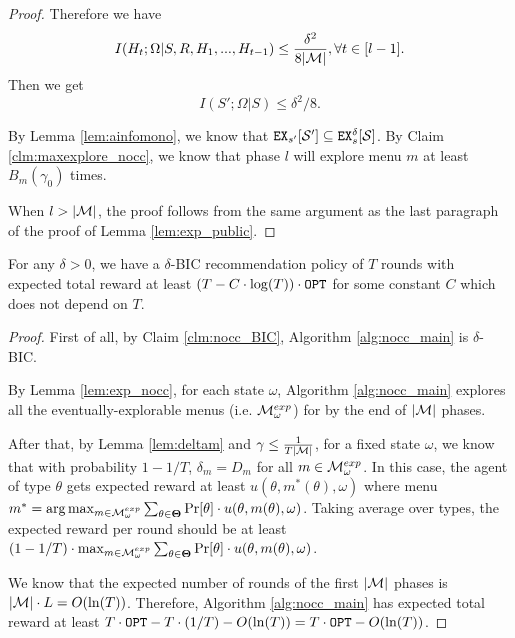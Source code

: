 \begin{proof}
Therefore we have
\[
I(H_t; \Omega|S,R,H_1,...,H_{t-1}) \leq \frac{\delta^2}{8|\mathcal{M}|}, \forall t \in [l-1].
\]
Then we get 
\[
I(S'; \Omega | S) \leq \delta^2/8.
\]

By Lemma \ref{lem:ainfomono}, we know that $\mathtt{EX}_{s'}[\mathcal{S}'] \subseteq \mathtt{EX}^{\delta}_s[\mathcal{S}]$. By Claim \ref{clm:maxexplore_nocc}, we know that phase $l$ will explore menu $m$ at least $B_m(\gamma_0)$ times.

When $l > |\mathcal{M}|$, the proof follows from the same argument as the last paragraph of the proof of Lemma \ref{lem:exp_public}.
\end{proof}

\begin{corollary}
\label{cor:private_nocc}
For any $\delta > 0$, we have a $\delta$-BIC recommendation policy of $T$ rounds with expected total reward at least $\left(T - C\cdot \log(T) \right) \cdot \mathtt{OPT}$ for some constant $C$ which does not depend on $T$. 
\end{corollary}

\begin{proof}

First of all, by Claim \ref{clm:nocc_BIC}, Algorithm \ref{alg:nocc_main} is $\delta$-BIC. 

By Lemma \ref{lem:exp_nocc}, for each state $\omega$, Algorithm \ref{alg:nocc_main} explores all the eventually-explorable menus (i.e. $\mathcal{M}_{\omega}^{exp}$) for by the end of $|\mathcal{M}|$ phases. 

After that, by Lemma \ref{lem:deltam} and $\gamma \leq \frac{1}{T|\mathcal{M}|}$, for a fixed state $\omega$, we know that with probability $1- 1/T$, $\delta_m = D_m$ for all $m \in \mathcal{M}_{\omega}^{exp}$. In this case, the agent of type $\theta$ gets expected reward at least $u(\theta,m^*(\theta),\omega)$ where menu $m^* =\arg\max_{m \in \mathcal{M}_{\omega}^{exp}} \sum_{\theta \in \bold{\Theta}} \Pr[\theta] \cdot u(\theta, m(\theta), \omega)$. Taking average over types, the expected reward per round should be at least $(1-1/T) \cdot \max_{m \in \mathcal{M}_{\omega}^{exp}} \sum_{\theta \in \bold{\Theta}} \Pr[\theta] \cdot u(\theta, m(\theta), \omega)$.

We know that the expected number of rounds of the first $|\mathcal{M}|$ phases is $|\mathcal{M}| \cdot L = O(\ln(T))$. Therefore, Algorithm \ref{alg:nocc_main} has expected total reward at least $T \cdot \mathtt{OPT}- T \cdot (1/T) - O(\ln(T)) = T\cdot \mathtt{OPT} - O(\ln(T))$.

\end{proof}

